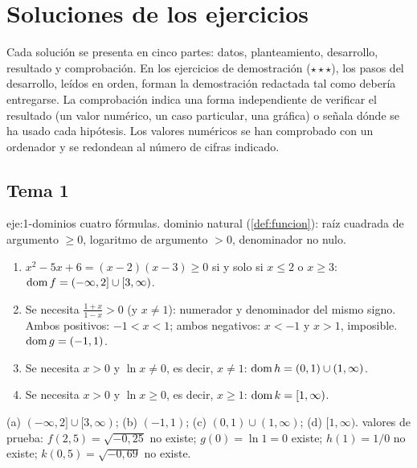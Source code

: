 \chapter{Soluciones de los ejercicios}
\label{ap:soluciones}

Cada solución se presenta en cinco partes: datos, planteamiento, desarrollo, resultado y comprobación. En los ejercicios de demostración ($\star\star\star$), los pasos del desarrollo, leídos en orden, forman la demostración redactada tal como debería entregarse. La comprobación indica una forma independiente de verificar el resultado (un valor numérico, un caso particular, una gráfica) o señala dónde se ha usado cada hipótesis. Los valores numéricos se han comprobado con un ordenador y se redondean al número de cifras indicado.

\section{Tema 1}

\begin{solucion}{eje:1-dominios}
\datos cuatro fórmulas.
\planteamiento dominio natural (\cref{def:funcion}): raíz cuadrada de argumento $\ge0$, logaritmo de argumento $>0$, denominador no nulo.
\pasos
\begin{enumerate}[label=(\alph*)]
  \item $x^{2}-5x+6=(x-2)(x-3)\ge0$ si y solo si $x\le2$ o $x\ge3$: $\operatorname{dom} f=(-\infty,2]\cup[3,\infty)$.
  \item Se necesita $\frac{1+x}{1-x}>0$ (y $x\ne1$): numerador y denominador del mismo signo. Ambos positivos: $-1<x<1$; ambos negativos: $x<-1$ y $x>1$, imposible. $\operatorname{dom} g=(-1,1)$.
  \item Se necesita $x>0$ y $\ln x\ne0$, es decir, $x\ne1$: $\operatorname{dom} h=(0,1)\cup(1,\infty)$.
  \item Se necesita $x>0$ y $\ln x\ge0$, es decir, $x\ge1$: $\operatorname{dom} k=[1,\infty)$.
\end{enumerate}
\resultado (a) $(-\infty,2]\cup[3,\infty)$; (b) $(-1,1)$; (c) $(0,1)\cup(1,\infty)$; (d) $[1,\infty)$.
\comprobacion valores de prueba: $f(2{,}5)=\sqrt{-0{,}25}$ no existe; $g(0)=\ln1=0$ existe; $h(1)=1/0$ no existe; $k(0{,}5)=\sqrt{-0{,}69}$ no existe.
\end{solucion}

